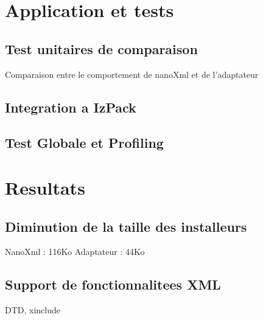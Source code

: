 \section{Application et tests}
\subsection{Test unitaires de comparaison}
Comparaison entre le comportement de nanoXml et de l'adaptateur
\subsection{Integration a IzPack}
\subsection{Test Globale et Profiling}

\section{Resultats}
\subsection{Diminution de la taille des installeurs}
NanoXml : 116Ko
Adaptateur : 44Ko
\subsection{Support de fonctionnalitees XML}
DTD, xinclude
